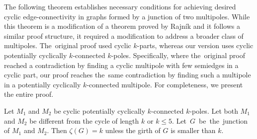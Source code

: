 \documentclass[12pt, twoside]{book}
\begin{document}
The following theorem establishes necessary conditions for achieving desired cyclic edge-connectivity in graphs formed by a junction of two multipoles. While this theorem is a modification of a theorem proved by Rajník \mbox{\cite[Theorem 5.2]{Rajnik_phd}} and it follows a similar proof structure, it required a modification to address a broader class of multipoles. The~original proof used cyclic $k$-parts, whereas our version uses cyclic potentially cyclically $k$-connected $k$-poles. Specifically, where the~original proof reached a contradiction by finding a cyclic multipole with few semiedges in a cyclic part, our proof reaches the~same contradiction by finding such a multipole in a potentially cyclically $k$-connected multipole. For completeness, we present the entire proof.

\begin{theorem}\label{th:junction-of-kpoles-cyclic-edge-connectivity}
	Let $M_1$ and $M_2$ be cyclic potentially cyclically $k$-connected $k$-poles. Let both $M_1$ and $M_2$ be different from the cycle of length $k$ or $k\leq 5$. \mbox{Let $G$ be the junction} of $M_1$ and $M_2$. Then $\zeta(G)=k$ unless the girth of $G$ is smaller than $k$.
\end{theorem}
\end{document}
